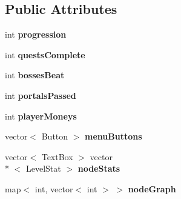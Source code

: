 \subsection*{Public Attributes}
\begin{DoxyCompactItemize}
\item 
\hypertarget{classMenuDesigner_ae0a144e59f8609c5884b75cbaf0fc25e}{int {\bfseries progression}}\label{classMenuDesigner_ae0a144e59f8609c5884b75cbaf0fc25e}

\item 
\hypertarget{classMenuDesigner_a3bd284998e574f65f2533ad42daa775c}{int {\bfseries quests\-Complete}}\label{classMenuDesigner_a3bd284998e574f65f2533ad42daa775c}

\item 
\hypertarget{classMenuDesigner_a92540ef5037bf88d8e7588654fd90602}{int {\bfseries bosses\-Beat}}\label{classMenuDesigner_a92540ef5037bf88d8e7588654fd90602}

\item 
\hypertarget{classMenuDesigner_af6704c0a01341b0b267113e6ea4d5935}{int {\bfseries portals\-Passed}}\label{classMenuDesigner_af6704c0a01341b0b267113e6ea4d5935}

\item 
\hypertarget{classMenuDesigner_a2e0402f6622f7d42e8bedc4a109265c9}{int {\bfseries player\-Moneys}}\label{classMenuDesigner_a2e0402f6622f7d42e8bedc4a109265c9}

\item 
\hypertarget{classMenuDesigner_aad1760890b60a8b191d60c4746c63c0f}{vector$<$ Button $>$ {\bfseries menu\-Buttons}}\label{classMenuDesigner_aad1760890b60a8b191d60c4746c63c0f}

\item 
\hypertarget{classMenuDesigner_a82765bc6caef9839312e0a30dce729fb}{vector$<$ Text\-Box $>$ vector\\*
$<$ Level\-Stat $>$ {\bfseries node\-Stats}}\label{classMenuDesigner_a82765bc6caef9839312e0a30dce729fb}

\item 
\hypertarget{classMenuDesigner_afcaf6fd573988356b45f3a43725fdaae}{map$<$ int, vector$<$ int $>$ $>$ {\bfseries node\-Graph}}\label{classMenuDesigner_afcaf6fd573988356b45f3a43725fdaae}

\end{DoxyCompactItemize}


